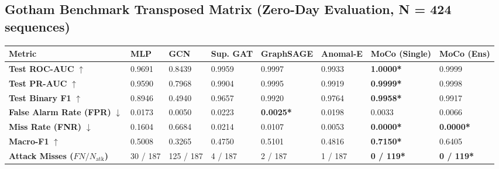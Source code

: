 \documentclass[10pt,a4paper]{article}
\newcommand{\best}[1]{\textbf{\textcolor{bestgreen}{#1*}}}
\begin{document}
\subsection{Gotham Benchmark Transposed Matrix (Zero-Day Evaluation, N = 424 sequences)}
\begin{table}[htbp]
\centering
\small
\begin{tabularx}{\textwidth}{lXXXXXXX}
\toprule
\textbf{Metric} & \textbf{MLP} & \textbf{GCN} & \textbf{Sup. GAT} & \textbf{GraphSAGE} & \textbf{Anomal-E} & \textbf{MoCo (Single)} & \textbf{MoCo (Ens)} \\
\midrule
\textbf{Test ROC-AUC} $\uparrow$ & 0.9691 & 0.8439 & 0.9959 & 0.9997 & 0.9933 & \best{1.0000} & 0.9999 \\
\textbf{Test PR-AUC} $\uparrow$ & 0.9590 & 0.7968 & 0.9904 & 0.9995 & 0.9919 & \best{0.9999} & 0.9998 \\
\textbf{Test Binary F1} $\uparrow$ & 0.8946 & 0.4940 & 0.9657 & 0.9920 & 0.9764 & \best{0.9958} & 0.9917 \\
\textbf{False Alarm Rate (FPR)} $\downarrow$ & 0.0173 & 0.0050 & 0.0223 & \best{0.0025} & 0.0198 & 0.0033 & 0.0066 \\
\textbf{Miss Rate (FNR)} $\downarrow$ & 0.1604 & 0.6684 & 0.0214 & 0.0107 & 0.0053 & \best{0.0000} & \best{0.0000} \\
\textbf{Macro-F1} $\uparrow$ & 0.5008 & 0.3265 & 0.4750 & 0.5101 & 0.4816 & \best{0.7150} & 0.6405 \\
\textbf{Attack Misses ($FN / N_{\text{atk}}$)} & 30 / 187 & 125 / 187 & 4 / 187 & 2 / 187 & 1 / 187 & \best{0 / 119} & \best{0 / 119} \\
\bottomrule
\end{tabularx}
\end{table}
\end{document}
